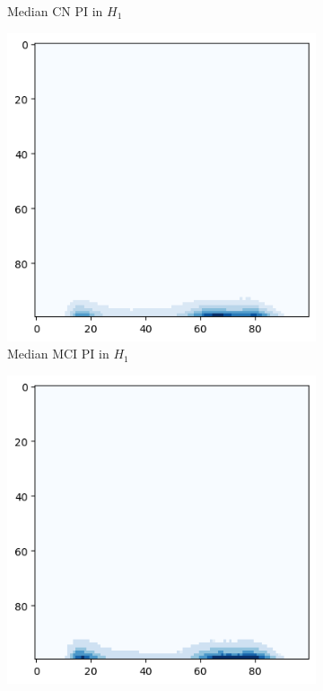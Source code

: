 \documentclass{article}
\begin{document}
\begin{figure}
\begin{subfigure}{0.32\textwidth}
    \caption{Median CN PI in $H_1$}
  \end{subfigure}
  \begin{subfigure}{0.32\textwidth}
    \includegraphics[width=\textwidth]{figures/median_pls/median_pi_MCI_h_1.png}
    \caption{Median MCI PI in $H_1$}
  \end{subfigure}
  \begin{subfigure}{0.32\textwidth}
    \includegraphics[width=\textwidth]{figures/median_pls/median_pi_AD_h_1.png}

\end{subfigure}
\end{figure}
\end{document}

